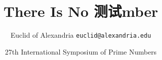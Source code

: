 \documentclass[aspectratio=169]{beamer}
\title{There Is No 测试mber}
\date[ISPN ’80]{27th International Symposium of Prime Numbers}
\author[Euclid]{Euclid of Alexandria \texttt{euclid@alexandria.edu}}
\begin{document}
	
	\begin{frame}
		
    \titlepage
	\end{frame}
\end{document}
